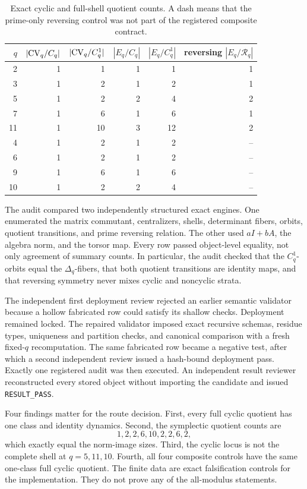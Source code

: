 \documentclass[11pt]{article}
\theoremstyle{definition}
\theoremstyle{remark}
\begin{document}
\begin{table}[htbp]
\centering
\small
\caption{Exact cyclic and full-shell quotient counts.  A dash means that
the prime-only reversing control was not part of the registered composite
contract.}
\label{tab:registered-quotient-ledger}
\begin{tabular}{rrrrrr}
\toprule
\(q\) & \(|\mathrm{CV}_q/C_q|\) & \(|\mathrm{CV}_q/C_q^1|\) &
\(|E_q/C_q|\) & \(|E_q/C_q^1|\) & reversing \(|E_q/\mathcal R_q|\) \\
\midrule
2  & 1 & 1  & 1 & 1  & 1 \\
3  & 1 & 2  & 1 & 2  & 1 \\
5  & 1 & 2  & 2 & 4  & 2 \\
7  & 1 & 6  & 1 & 6  & 1 \\
11 & 1 & 10 & 3 & 12 & 2 \\
4  & 1 & 2  & 1 & 2  & -- \\
6  & 1 & 2  & 1 & 2  & -- \\
9  & 1 & 6  & 1 & 6  & -- \\
10 & 1 & 2  & 2 & 4  & -- \\
\bottomrule
\end{tabular}
\end{table}

The audit compared two independently structured exact engines.  One
enumerated the matrix commutant, centralizers, shells, determinant fibers,
orbits, quotient transitions, and prime reversing relation.  The other used
\(aI+bA\), the algebra norm, and the torsor map.  Every row passed
object-level equality, not only agreement of summary counts.  In particular,
the audit checked that the \(C_q^1\)-orbits equal the \(\Delta_q\)-fibers,
that both quotient transitions are identity maps, and that reversing
symmetry never mixes cyclic and noncyclic strata.

The independent first deployment review rejected an earlier semantic
validator because a hollow fabricated row could satisfy its shallow checks.
Deployment remained locked.  The repaired validator imposed exact recursive
schemas, residue types, uniqueness and partition checks, and canonical
comparison with a fresh fixed-\(q\) recomputation.  The same fabricated row
became a negative test, after which a second independent review issued a
hash-bound deployment pass.  Exactly one registered audit was then executed.
An independent result reviewer reconstructed every stored object without
importing the candidate and issued \texttt{RESULT\_PASS}.

Four findings matter for the route decision.  First, every full cyclic
quotient has one class and identity dynamics.  Second, the symplectic
quotient counts are
\begin{equation}
  1,2,2,6,10,2,2,6,2,
  \label{eq:observed-norm-classes}
\end{equation}
which exactly equal the norm-image sizes.  Third, the cyclic locus is not
the complete shell at \(q=5,11,10\).  Fourth, all four composite controls
have the same one-class full cyclic quotient.  The finite data are exact
falsification controls for the implementation.  They do not prove any of the
all-modulus statements.
\end{document}
